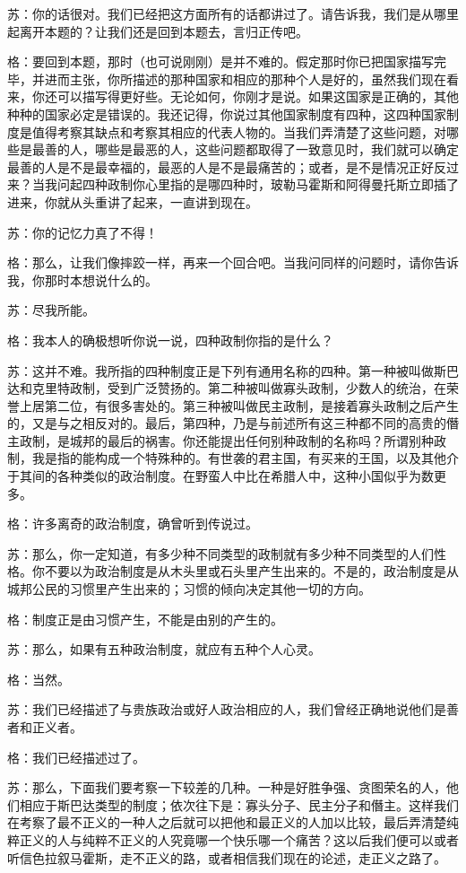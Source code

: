 \documentclass[12pt,oneside]{book}
\begin{document}
苏：你的话很对。我们已经把这方面所有的话都讲过了。请告诉我，我们是从哪里起离开本题的？让我们还是回到本题去，言归正传吧。

格：要回到本题，那时（也可说刚刚）是并不难的。假定那时你已把国家描写完毕，并进而主张，你所描述的那种国家和相应的那种个人是好的，虽然我们现在看来，你还可以描写得更好些。无论如何，你刚才是说。如果这国家是正确的，其他种种的国家必定是错误的。我还记得，你说过其他国家制度有四种，这四种国家制度是值得考察其缺点和考察其相应的代表人物的。当我们弄清楚了这些问题，对哪些是最善的人，哪些是最恶的人，这些问题都取得了一致意见时，我们就可以确定最善的人是不是最幸福的，最恶的人是不是最痛苦的；或者，是不是情况正好反过来？当我问起四种政制你心里指的是哪四种时，玻勒马霍斯和阿得曼托斯立即插了进来，你就从头重讲了起来，一直讲到现在。

苏：你的记忆力真了不得！

格：那么，让我们像摔跤一样，再来一个回合吧。当我问同样的问题时，请你告诉我，你那时本想说什么的。

苏：尽我所能。

格：我本人的确极想听你说一说，四种政制你指的是什么？

苏：这并不难。我所指的四种制度正是下列有通用名称的四种。第一种被叫做斯巴达和克里特政制，受到广泛赞扬的。第二种被叫做寡头政制，少数人的统治，在荣誉上居第二位，有很多害处的。第三种被叫做民主政制，是接着寡头政制之后产生的，又是与之相反对的。最后，第四种，乃是与前述所有这三种都不同的高贵的僭主政制，是城邦的最后的祸害。你还能提出任何别种政制的名称吗？所谓别种政制，我是指的能构成一个特殊种的。有世袭的君主国，有买来的王国，以及其他介于其间的各种类似的政治制度。在野蛮人中比在希腊人中，这种小国似乎为数更多。

格：许多离奇的政治制度，确曾听到传说过。

苏：那么，你一定知道，有多少种不同类型的政制就有多少种不同类型的人们性格。你不要以为政治制度是从木头里或石头里产生出来的。不是的，政治制度是从城邦公民的习惯里产生出来的；习惯的倾向决定其他一切的方向。

格：制度正是由习惯产生，不能是由别的产生的。

苏：那么，如果有五种政治制度，就应有五种个人心灵。

格：当然。

苏：我们已经描述了与贵族政治或好人政治相应的人，我们曾经正确地说他们是善者和正义者。

格：我们已经描述过了。

苏：那么，下面我们要考察一下较差的几种。一种是好胜争强、贪图荣名的人，他们相应于斯巴达类型的制度；依次往下是：寡头分子、民主分子和僭主。这样我们在考察了最不正义的一种人之后就可以把他和最正义的人加以比较，最后弄清楚纯粹正义的人与纯粹不正义的人究竟哪一个快乐哪一个痛苦？这以后我们便可以或者听信色拉叙马霍斯，走不正义的路，或者相信我们现在的论述，走正义之路了。
\end{document}
